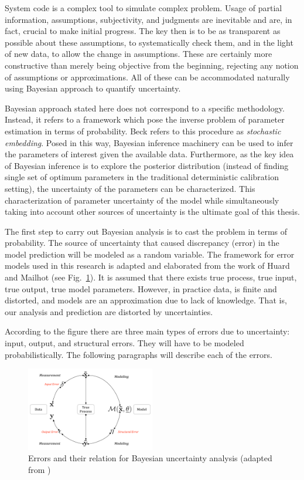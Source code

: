 \documentclass[11pt,titlepage]{article}
\begin{document}
System code is a complex tool to simulate complex problem. 
Usage of partial information, assumptions, subjectivity, and judgments are inevitable and are, in fact, crucial to make initial progress. 
The key then is to be as transparent as possible about these assumptions, to systematically check them, and in the light of new data, to allow the change in assumptions. 
These are certainly more constructive than merely being objective from the beginning, rejecting any notion of assumptions or approximations. 
All of these can be accommodated naturally using Bayesian approach to quantify uncertainty.

Bayesian approach stated here does not correspond to a specific methodology. 
Instead, it refers to a framework which pose the inverse problem of parameter estimation in terms of probability. 
Beck \cite{Beck2010} refers to this procedure as \emph{stochastic embedding}. 
Posed in this way, Bayesian inference machinery can be used to infer the parameters of interest given the available data. 
Furthermore, as the key idea of Bayesian inference is to explore the posterior distribution (instead of finding single set of optimum parameters in the traditional deterministic calibration setting), the uncertainty of the parameters can be characterized. 
This characterization of parameter uncertainty of the model while simultaneously taking into account other sources of uncertainty is the ultimate goal of this thesis. 

The first step to carry out Bayesian analysis is to cast the problem in terms of probability. 
The source of uncertainty that caused discrepancy (error) in the model prediction will be modeled as a random variable. 
The framework for error models used in this research is adapted and elaborated from the work of Huard and Mailhot \cite{HuardMailhot2006} (see Fig.~\ref{fig:HuardMailhot}). 
It is assumed that there exists true process, true input, true output, true model parameters. 
However, in practice data, is finite and distorted, and models are an approximation due to lack of knowledge. 
That is, our analysis and prediction are distorted by uncertainties. 

According to the figure there are three main types of errors due to uncertainty: input, output, and structural errors. 
They will have to be modeled probabilistically.
The following paragraphs will describe each of the errors.
\begin{figure}[htbp]
	\centering
	\includegraphics[width=0.50\textwidth]{HuardMailhot.pdf}
	\caption{Errors and their relation for Bayesian uncertainty analysis (adapted from \cite{HuardMailhot2006})}
	\label{fig:HuardMailhot}
\end{figure}
\end{document}
